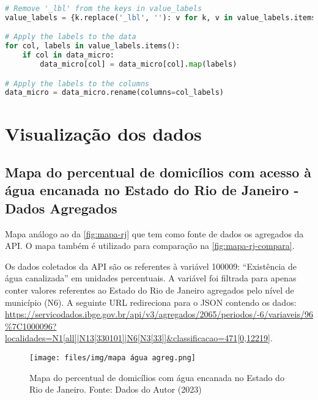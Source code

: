 \begin{apendicesenv}
\begin{lstlisting}[label={lst:read-stata},language=Python, caption=\textit{Script} de carga dos indicadores da API de países.]
# Remove '_lbl' from the keys in value_labels
value_labels = {k.replace('_lbl', ''): v for k, v in value_labels.items()}

# Apply the labels to the data
for col, labels in value_labels.items():
    if col in data_micro:
        data_micro[col] = data_micro[col].map(labels)

# Apply the labels to the columns
data_micro = data_micro.rename(columns=col_labels)
\end{lstlisting}

\chapter{Visualização dos dados}

\section{Mapa do percentual de domicílios com acesso à água encanada no Estado do Rio de Janeiro - Dados Agregados}
\label{sec-ap-img}

    Mapa análogo ao da \ref{fig:mapa-rj} que tem como fonte de dados os agregados da API. O mapa também é utilizado para comparação na \ref{fig:mapa-rj-compara}.

    Os dados coletados da API são os referentes à variável 100009: ``Existência de água canalizada'' em unidades percentuais. A variável foi filtrada para apenas conter valores referentes ao Estado do Rio de Janeiro agregados pelo nível de município (N6). A seguinte URL redireciona para o JSON contendo os dados: \url{https://servicodados.ibge.gov.br/api/v3/agregados/2065/periodos/-6/variaveis/96%7C1000096?localidades=N1[all]|N13[330101]|N6[N3[33]]&classificacao=471[0,12219]}.

\begin{figure}[ht]
    \centering
    \texttt{[image: files/img/mapa água agreg.png]}
    \caption{Mapa do percentual de domicílios com água encanada no Estado do Rio de Janeiro. Fonte: Dados do Autor (2023)\protect\footnotemark}
    \label{fig:mapa-rj-agg}
\end{figure}

\end{apendicesenv}